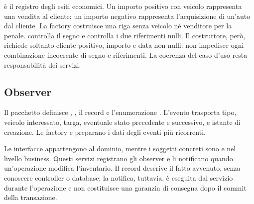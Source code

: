  è il registro degli esiti economici. Un importo positivo con veicolo rappresenta una vendita al cliente; un importo negativo rappresenta l'acquisizione di un'auto dal cliente. La factory  costruisce una riga senza veicolo né venditore per la penale.  controlla il segno e  controlla i due riferimenti nulli. Il costruttore, però, richiede soltanto cliente positivo, importo e data non nulli: non impedisce ogni combinazione incoerente di segno e riferimenti. La coerenza del caso d'uso resta responsabilità dei servizi.

\subsection{Observer}
Il pacchetto  definisce , , il record  e l'enumerazione . L'evento trasporta tipo, veicolo interessato, targa, eventuale stato precedente e successivo, e istante di creazione. Le factory  e  preparano i dati degli eventi più ricorrenti.

Le interfacce appartengono al dominio, mentre i soggetti concreti sono  e  nel livello business. Questi servizi registrano gli observer e li notificano quando un'operazione modifica l'inventario. Il record descrive il fatto avvenuto, senza conoscere controller o database; la notifica, tuttavia, è eseguita dal servizio durante l'operazione e non costituisce una garanzia di consegna dopo il commit della transazione.
